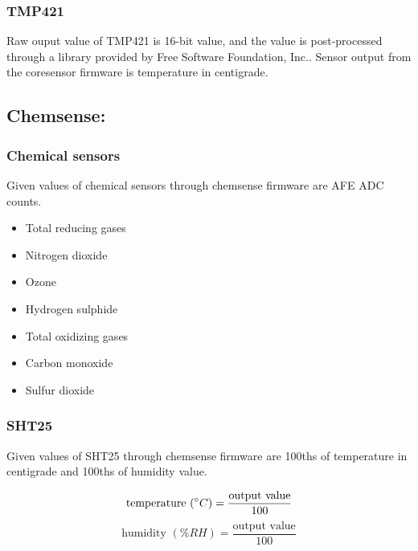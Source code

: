 
\subsubsection{ TMP421}

Raw ouput value of TMP421 is 16-bit value, and the value is post-processed through a library provided by Free Software Foundation, Inc.. Sensor output from the coresensor firmware is temperature in centigrade.


\subsection{Chemsense:}
\subsubsection{ Chemical sensors}

Given values of chemical sensors through chemsense firmware are AFE ADC counts.

\begin{itemize}
  \item Total reducing gases
  \item Nitrogen dioxide
  \item Ozone
  \item Hydrogen sulphide
  \item Total oxidizing gases
  \item Carbon monoxide
  \item Sulfur dioxide
\end{itemize}


\subsubsection{ SHT25}

Given values of SHT25 through chemsense firmware are 100ths of temperature in centigrade and 100ths of humidity value.

{\centering
 \[ \text{temperature }(\degree C) = \frac{\text{output value}}{100} \]
 \[ \text{humidity }(\% RH) = \frac{\text{output value}}{100} \]
 \par
 }

